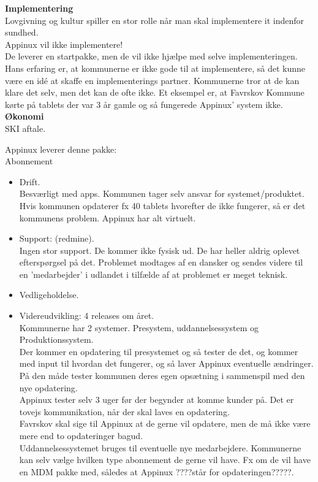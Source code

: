 \textbf{Implementering} 
\\
Lovgivning og kultur spiller en stor rolle når man skal implementere it indenfor sundhed.\\
Appinux vil ikke implementere! \\
De leverer en startpakke, men de vil ikke hjælpe med selve implementeringen. 
Hans erfaring er, at kommunerne er ikke gode til at implementere, så det kunne være en idé at skaffe en implementerings partner.
Kommunerne tror at de kan klare det selv, men det kan de ofte ikke.
Et eksempel er, at Favrskov Kommune kørte på tablets der var 3 år gamle og så fungerede Appinux' system ikke.\\


\textbf{Økonomi} 
\\
SKI aftale.

Appinux leverer denne pakke:\\
Abonnement
\begin{itemize}
	\item Drift. \\ Besværligt med apps. Kommunen tager selv ansvar for systemet/produktet. Hvis kommunen opdaterer fx 40 tablets hvorefter de ikke fungerer, så er det kommunens problem. Appinux har alt virtuelt.
	\item Support: (redmine). \\ Ingen stor support. De kommer ikke fysisk ud. De har heller aldrig oplevet efterspørgsel på det. Problemet modtages af en dansker og sendes videre til en 'medarbejder' i udlandet i tilfælde af at problemet er meget teknisk.
	\item Vedligeholdelse.
	\item Videreudvikling: 4 releases om året. \\ Kommunerne har 2 systemer. Presystem, uddannelsessystem og Produktionssystem.\\
Der kommer en opdatering til presystemet og så tester de det, og kommer med input til hvordan det fungerer, og så laver Appinux eventuelle ændringer.\\
På den måde tester kommunen deres egen opsætning i sammenspil med den nye opdatering.\\
Appinux tester selv 3 uger før der begynder at komme kunder på. Det er tovejs kommunikation, når der skal laves en opdatering.\\
Favrskov skal sige til Appinux at de gerne vil opdatere, men de må ikke være mere end to opdateringer bagud.\\
Uddannelsessystemet bruges til eventuelle nye medarbejdere. 
Kommunerne kan selv vælge hvilken type abonnement de gerne vil have. Fx om de vil have en MDM pakke med, således at Appinux ????står for opdateringen?????.
\end{itemize}

